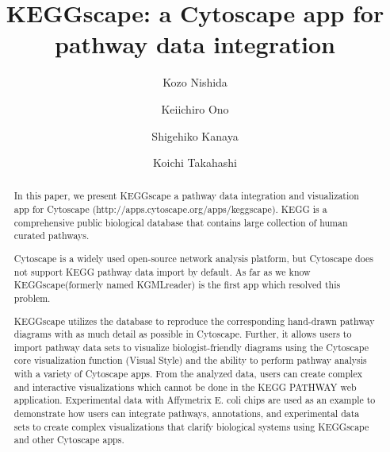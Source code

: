 \documentclass[10pt,a4paper,twocolumn]{article}
\begin{document}
\title{KEGGscape: a Cytoscape app for pathway data integration}
\author[1, 2, *]{Kozo Nishida}
\author[3, *]{Keiichiro Ono}
\author[4]{Shigehiko Kanaya}
\author[1]{Koichi Takahashi}

\maketitle
\thispagestyle{fancy}

\begin{abstract}

In this paper, we present KEGGscape a pathway data integration and visualization app for Cytoscape (http://apps.cytoscape.org/apps/keggscape).  KEGG is a comprehensive public biological database that contains large collection of human curated pathways.

Cytoscape is a widely used open-source network analysis platform, but Cytoscape does not support KEGG pathway data import by default. As far as we know KEGGscape(formerly named KGMLreader) is the first app which resolved this problem.

KEGGscape utilizes the database to reproduce the corresponding hand-drawn pathway diagrams with as much detail as possible in Cytoscape. Further, it allows users to import pathway data sets to visualize biologist-friendly diagrams using the Cytoscape core visualization function (Visual Style) and the ability to perform pathway analysis with a variety of Cytoscape apps.  From the analyzed data, users can create complex and interactive visualizations which cannot be done in the KEGG PATHWAY web application.  Experimental data with Affymetrix E. coli chips are used as an example to demonstrate how users can integrate pathways, annotations, and experimental data sets to create complex visualizations that clarify biological systems using KEGGscape and other Cytoscape apps.

\end{abstract}
\clearpage
\end{document}
